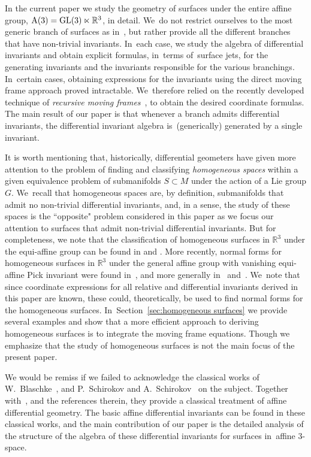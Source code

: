 \documentclass[pdftex]{sigma}%
\numberwithin{equation}{section}
\newcommand{\R}{\mathbb{R}}
\begin{document}
In the current paper we study the geometry of surfaces under the entire affine group, ${\rm A}(3)={\rm GL}(3)\ltimes \R^3$, in detail. We~do not restrict ourselves to the most generic branch of surfaces as \mbox{in~\cite{HO-2007, O-2009diff}}, but rather provide all the different branches that have non-trivial invariants. In~each case, we study the algebra of differential invariants and obtain explicit formulas, in~terms of~surface jets, for the generating invariants and the invariants responsible for the various bran\-chings. In~certain cases, obtaining expressions for the invariants using the direct moving frame approach proved intractable. We~therefore relied on the recently developed technique of \emph{recursive moving frames}~\cite{O-2011}, to obtain the desired coordinate formulas. The main result of our paper is that whenever a branch admits differential invariants, the differential invariant algebra is~(gene\-rically) generated by a single invariant.

It is worth mentioning that, historically, differential geometers have given more attention to the problem of finding and classifying \emph{homogeneous spaces} within a given equivalence problem of submanifolds $S\subset M$ under the action of a Lie group $G$. We~recall that homogeneous spaces are, by definition, submanifolds that admit no non-trivial differential invariants, and, in a sense, the study of these spaces is the ``opposite" problem considered in this paper as we focus our attention to surfaces that admit non-trivial differential invariants. But for completeness, we note that the classification of homogeneous surfaces in $\mathbb{R}^3$ under the equi-affine group can be found in \cite[Theorem~12.4]{G-1963} and \cite[Chapter~VI]{J-1977}. More recently, normal forms for homogeneous surfaces in $\R^3$ under the general affine group with vanishing equi-affine Pick invariant were found in~\cite{ADV-1997}, and more generally in~\cite{DKR-1996} and~\cite{EE-1999}. We~note that since coordinate expressions for all relative and differential invariants derived in this paper are known, these could, theoretically, be used to find normal forms for the homogeneous surfaces. In~Section~\ref{sec:homogeneous surfaces} we provide several examples and show that a more efficient approach to deriving homogeneous surfaces is to integrate the moving frame equations. Though we emphasize that the study of homogeneous surfaces is not the main focus of the present paper.

We would be remiss if we failed to acknowledge the classical works of W.~Blaschke~\cite{B-1923}, and P.~Schirokov and A.~Schirokov~\cite{SS-1962} on the subject. Together with~\cite{DMMSV-1991}, and the references therein, they provide a classical treatment of affine differential geometry. The basic affine differential invariants can be found in these classical works, and the main contribution of our paper is the detailed analysis of the structure of the algebra of these differential invariants for surfaces in~affine 3-space.
\end{document}
